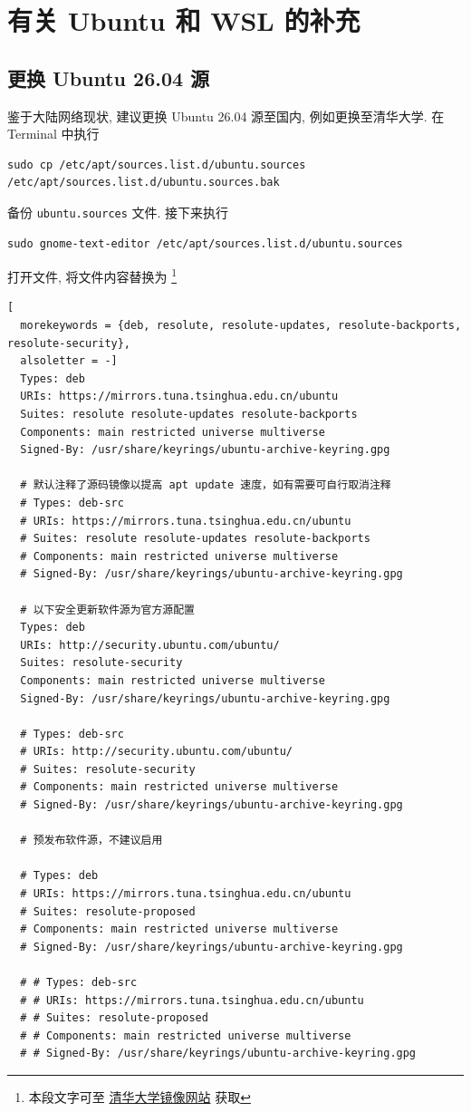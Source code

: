 
\chapter{有关 Ubuntu 和 WSL 的补充}\label{chp:appendix:addition}

\section{更换 Ubuntu 26.04 源}\label{sec:addition:source}

鉴于大陆网络现状,
建议更换 Ubuntu 26.04 源至国内,
例如更换至清华大学.
在 \textsf{Terminal} 中执行
\begin{lstlisting}[deletekeywords = apt]
  sudo cp /etc/apt/sources.list.d/ubuntu.sources /etc/apt/sources.list.d/ubuntu.sources.bak
\end{lstlisting}
备份 \texttt{ubuntu.sources} 文件.
接下来执行
\begin{lstlisting}[deletekeywords = apt]
  sudo gnome-text-editor /etc/apt/sources.list.d/ubuntu.sources
\end{lstlisting}
打开文件,
将文件内容替换为%
\footnote{本段文字可至%
\href{https://mirrors.tuna.tsinghua.edu.cn/help/ubuntu/}{清华大学镜像网站}%
获取}
\begin{lstlisting}[
  morekeywords = {deb, resolute, resolute-updates, resolute-backports, resolute-security},
  alsoletter = -]
  Types: deb
  URIs: https://mirrors.tuna.tsinghua.edu.cn/ubuntu
  Suites: resolute resolute-updates resolute-backports
  Components: main restricted universe multiverse
  Signed-By: /usr/share/keyrings/ubuntu-archive-keyring.gpg
  
  # 默认注释了源码镜像以提高 apt update 速度，如有需要可自行取消注释
  # Types: deb-src
  # URIs: https://mirrors.tuna.tsinghua.edu.cn/ubuntu
  # Suites: resolute resolute-updates resolute-backports
  # Components: main restricted universe multiverse
  # Signed-By: /usr/share/keyrings/ubuntu-archive-keyring.gpg
  
  # 以下安全更新软件源为官方源配置
  Types: deb
  URIs: http://security.ubuntu.com/ubuntu/
  Suites: resolute-security
  Components: main restricted universe multiverse
  Signed-By: /usr/share/keyrings/ubuntu-archive-keyring.gpg
  
  # Types: deb-src
  # URIs: http://security.ubuntu.com/ubuntu/
  # Suites: resolute-security
  # Components: main restricted universe multiverse
  # Signed-By: /usr/share/keyrings/ubuntu-archive-keyring.gpg
  
  # 预发布软件源，不建议启用
  
  # Types: deb
  # URIs: https://mirrors.tuna.tsinghua.edu.cn/ubuntu
  # Suites: resolute-proposed
  # Components: main restricted universe multiverse
  # Signed-By: /usr/share/keyrings/ubuntu-archive-keyring.gpg
  
  # # Types: deb-src
  # # URIs: https://mirrors.tuna.tsinghua.edu.cn/ubuntu
  # # Suites: resolute-proposed
  # # Components: main restricted universe multiverse
  # # Signed-By: /usr/share/keyrings/ubuntu-archive-keyring.gpg
\end{lstlisting}
